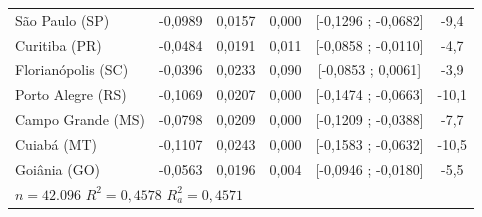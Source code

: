 \documentclass[12pt,a4paper,header]{abnt}
\begin{document}
\begin{center}
\begin{longtable}{lccccc}
São Paulo (SP) & -0,0989 & 0,0157 & 0,000 & [-0,1296 ; -0,0682] & -9,4 \\
Curitiba (PR) & -0,0484 & 0,0191 & 0,011 & [-0,0858 ; -0,0110] & -4,7 \\
Florianópolis (SC) & -0,0396 & 0,0233 & 0,090 & [-0,0853 ; 0,0061] & -3,9 \\
Porto Alegre (RS) & -0,1069 & 0,0207 & 0,000 & [-0,1474 ; -0,0663] & -10,1 \\
Campo Grande (MS) & -0,0798 & 0,0209 & 0,000 & [-0,1209 ; -0,0388] & -7,7 \\
Cuiabá (MT) & -0,1107 & 0,0243 & 0,000 & [-0,1583 ; -0,0632] & -10,5 \\
Goiânia (GO) & -0,0563 & 0,0196 & 0,004 & [-0,0946 ; -0,0180] & -5,5 \\
\midrule
\multicolumn{6}{l}{$n = 42.096$ \hspace{2cm} $R^2 = 0,4578$ \hspace{2cm} $R^2_a = 0,4571$} \\
\end{longtable}
\end{center}
\end{document}
